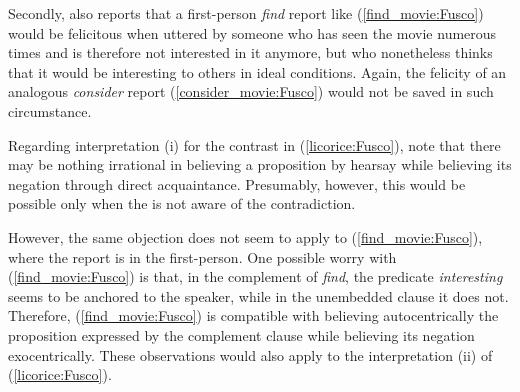\documentclass[output=paper,colorlinks,citecolor=brown]{langscibook}
\begin{document}
\ea \label{licorice:Fusco}
 \label{find_licorice:Fusco}
 \label{consider_licorice:Fusco}
\z
\z

Secondly, \citet{munoz2019} also reports that a first-person \textit{find} report like (\ref{find_movie:Fusco}) would be felicitous when uttered by someone who has seen the movie numerous times and is therefore not interested in it anymore, but who nonetheless thinks that it would be interesting to others in ideal conditions. 
Again, the felicity of an analogous \textit{consider} report (\ref{consider_movie:Fusco}) would not be saved in such circumstance.



\ea \label{movie:Fusco}
 \label{find_movie:Fusco}
 \label{consider_movie:Fusco}
\z
\z
{}

Regarding interpretation (i) for the contrast in (\ref{licorice:Fusco}), \citet[fn. 9]{kennedy_willer_2022} note that there may be nothing irrational in believing a proposition by hearsay while believing its negation through direct acquaintance. Presumably, however, this would be possible only when the  is not aware of the contradiction. 

However, the same objection does not seem to apply to (\ref{find_movie:Fusco}), where the report is in the first-person.
One possible worry with (\ref{find_movie:Fusco}) is that, in the complement of \textit{find}, the predicate \textit{interesting} seems to be anchored to the speaker, while in the unembedded clause it does not. Therefore, (\ref{find_movie:Fusco}) is compatible with believing autocentrically the proposition expressed by the complement clause while believing its negation exocentrically. These observations would also apply to the interpretation (ii) of (\ref{licorice:Fusco}).
\end{document}
